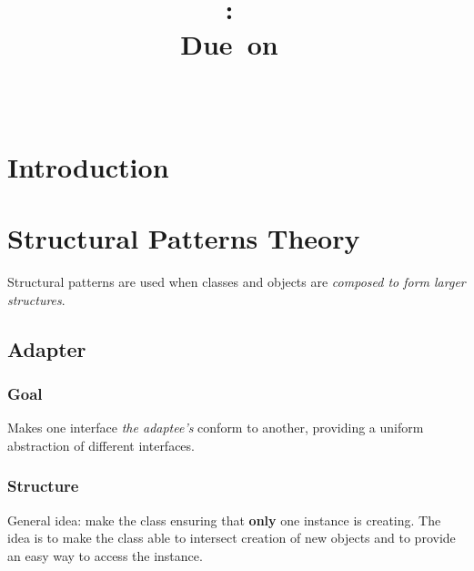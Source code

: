 \documentclass{article}
\title{
\vspace{2in}
\textmd{\textbf{\hmwkClass:\ \hmwkTitle}}\\
\normalsize\vspace{0.1in}\small{Due\ on\ \hmwkDueDate}\\
\vspace{0.1in}\large{\textit{\hmwkClassInstructor\ \hmwkClassTime}}
\vspace{3in}
}
\author{\textbf{\hmwkAuthorName}}
\date{} %
\begin{document}
\maketitle



\newpage
\tableofcontents
\newpage



\section{Introduction}


\section{Structural Patterns Theory}
Structural patterns are used when classes and objects are \emph{composed to form larger structures}.

\subsection{Adapter}
\label{Adapter}
\subsubsection{Goal}
Makes one interface \emph{the adaptee's} conform to another, providing a uniform abstraction of different interfaces. 

\subsubsection{Structure}
General idea: make the class ensuring that \textbf{only} one instance is creating. The idea is to make the class able to intersect creation of new objects and to provide an easy way to access the instance.
\end{document}
